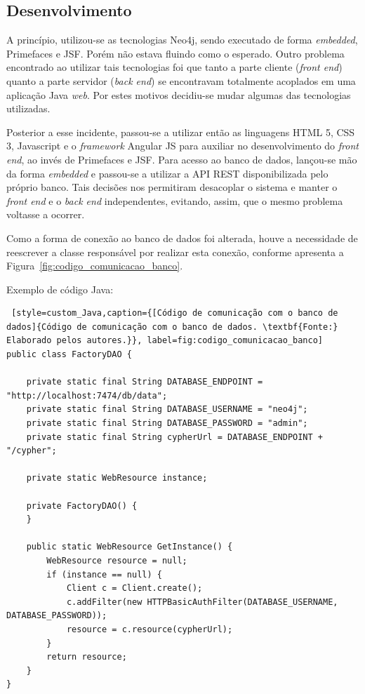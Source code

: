 \subsection{Desenvolvimento}

\par A princípio, utilizou-se as tecnologias Neo4j, sendo executado de forma \textit{embedded}, Primefaces e JSF. Porém não estava fluindo como o esperado. Outro problema encontrado ao utilizar tais tecnologias foi que tanto a parte cliente (\textit{front end}) quanto a parte servidor (\textit{back end}) se encontravam totalmente acoplados em uma aplicação Java \textit{web}. Por estes motivos decidiu-se mudar algumas das tecnologias utilizadas.

\par Posterior a esse incidente, passou-se a utilizar então as linguagens HTML 5, CSS 3, Javascript e o \textit{framework} Angular JS para auxiliar no desenvolvimento do \textit{front end}, ao invés de Primefaces e JSF. Para acesso ao banco de dados, lançou-se mão da forma \textit{embedded} e passou-se a utilizar a API REST disponibilizada pelo próprio banco. Tais decisões nos permitiram desacoplar o sistema e manter o \textit{front end} e o \textit{back end} independentes, evitando, assim, que o mesmo problema voltasse a ocorrer.

\par Como a forma de conexão ao banco de dados foi alterada, houve a necessidade de reescrever a classe responsável por realizar esta conexão, conforme apresenta a Figura~\ref{fig:codigo_comunicacao_banco}.


Exemplo de código Java:

\begin{lstlisting} [style=custom_Java,caption={[Código de comunicação com o banco de dados]{Código de comunicação com o banco de dados. \textbf{Fonte:} Elaborado pelos autores.}}, label=fig:codigo_comunicacao_banco] 	
public class FactoryDAO {

	private static final String DATABASE_ENDPOINT = "http://localhost:7474/db/data";
	private static final String DATABASE_USERNAME = "neo4j";
	private static final String DATABASE_PASSWORD = "admin";
	private static final String cypherUrl = DATABASE_ENDPOINT + "/cypher";
	
	private static WebResource instance;
	
	private FactoryDAO() {
	}
	
	public static WebResource GetInstance() {
		WebResource resource = null;
		if (instance == null) {
			Client c = Client.create();
			c.addFilter(new HTTPBasicAuthFilter(DATABASE_USERNAME, DATABASE_PASSWORD));
			resource = c.resource(cypherUrl);
		}
		return resource;
	}
}
\end{lstlisting}

